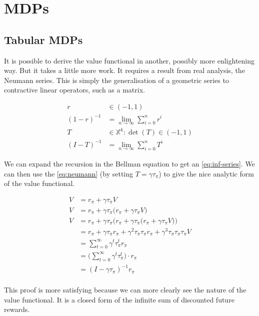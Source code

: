 \chapter{MDPs}

\section{Tabular MDPs}\label{vf-neumann}

It is possible to derive the value functional in another, possibly more enlightening way. But it takes a little more work. It requires a result from real analysis, the Neumann series. This is simply the generalisation of a geometric series to contractive linear operators, such as a matrix.

\begin{align*}
r &\in (-1, 1) \\
(1-r)^{-1} &= \lim_{n\to \infty} \sum_{i=0}^n r^i \label{eq:geom}\tag{Geometric series}\\
T &\in \mathbb X^k: \det(T) \in (-1, 1) \\
(I-T)^{-1} &= \lim_{n\to \infty} \sum_{i=0}^n T^i \label{eq:neumann}\tag{Neumann series}
\end{align*}

We can expand the recursion in the Bellman equation to get an \eqref{eq:inf-series}. We can then use the \eqref{eq:neumann} (by setting $T=\gamma \tau_{\pi}$) to give the nice analytic form of the value functional.

\begin{align*}
V &= r_{\pi} + \gamma \tau_{\pi} V \tag{Bellman eqn}\\
V &= r_{\pi} + \gamma \tau_{\pi}\big( r_{\pi} + \gamma \tau_{\pi} V\big) \\
V &= r_{\pi} + \gamma \tau_{\pi}\Big(r_{\pi} + \gamma \tau_{\pi}\big( r_{\pi} + \gamma \tau_{\pi} V\big)) \\
&= r_{\pi} + \gamma \tau_{\pi}r_\pi + \gamma^2 \tau_{\pi}\tau_{\pi}r_{\pi} + \gamma^3 \tau_{\pi}\tau_{\pi}\tau_{\pi}V \\
&= \sum_{t=0}^{\infty} \gamma^t\tau_{\pi}^tr_{\pi} \label{eq:inf-series}\tag{infinite series} \\
&= \big( \sum_{t=0}^{\infty} \gamma^t\tau_{\pi}^t \big) \cdot r_{\pi}\\
&= (I-\gamma \tau_{\pi})^{-1} r_{\pi} \tag{value functional}\\
\end{align*}

This proof is more satisfying because we can more clearly see the nature of the value functional. It is a closed form of the infinite sum of discounted future rewards.


